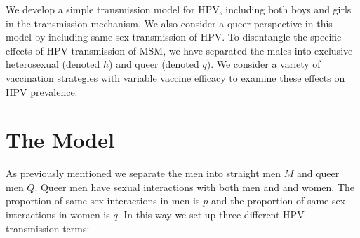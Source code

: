 \documentclass[12pt]{article}
\begin{document}
We develop a simple transmission model for HPV, including both boys and girls in the transmission mechanism.  We also consider a queer perspective in this model by including same-sex transmission of HPV.  To disentangle the specific effects of HPV transmission of MSM, we have separated the males into exclusive heterosexual (denoted $h$) and queer (denoted $q$).  We consider a variety of vaccination strategies with variable vaccine efficacy to examine these effects on HPV prevalence.  
 

\section*{The Model}

As previously mentioned we separate the men into straight men $M$ and queer men $Q$.  Queer men have sexual interactions with both men and and women.  The proportion of same-sex interactions in men is $p$ and the proportion of same-sex interactions in women is $q$.  In this way we set up three different HPV transmission terms:
\end{document}
